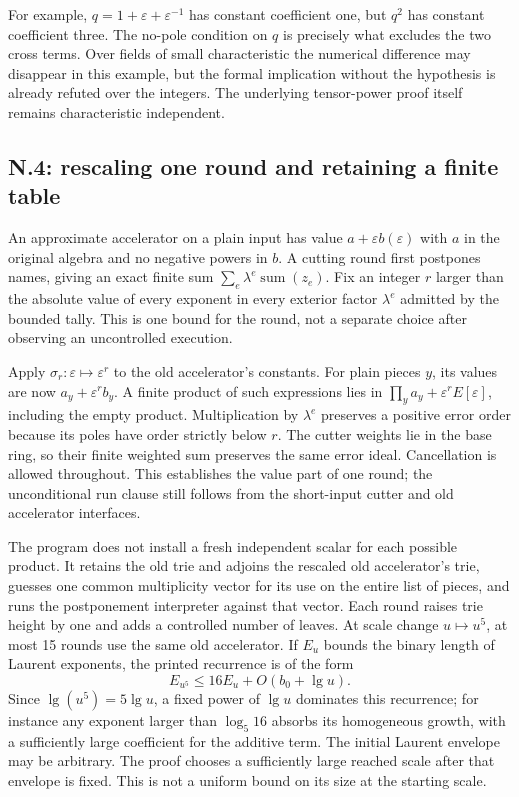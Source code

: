 \documentclass[11pt,letterpaper]{article}
\theoremstyle{definition}\newtheorem{definition}[theorem]{Definition}\newtheorem{example}[theorem]{Example}
\theoremstyle{remark}\newtheorem{remark}[theorem]{Remark}
\begin{document}
For example, $q=1+\varepsilon+\varepsilon^{-1}$ has constant coefficient one, but $q^2$ has constant coefficient three. The no-pole condition on $q$ is precisely what excludes the two cross terms. Over fields of small characteristic the numerical difference may disappear in this example, but the formal implication without the hypothesis is already refuted over the integers. The underlying tensor-power proof itself remains characteristic independent.

\subsection{N.4: rescaling one round and retaining a finite table}
An approximate accelerator on a plain input has value $a+\varepsilon b(\varepsilon)$ with $a$ in the original algebra and no negative powers in $b$. A cutting round first postpones names, giving an exact finite sum $\sum_e\lambda^e\operatorname{sum}(z_e)$. Fix an integer $r$ larger than the absolute value of every exponent in every exterior factor $\lambda^e$ admitted by the bounded tally. This is one bound for the round, not a separate choice after observing an uncontrolled execution.

Apply $\sigma_r:\varepsilon\mapsto\varepsilon^r$ to the old accelerator's constants. For plain pieces $y$, its values are now $a_y+\varepsilon^rb_y$. A finite product of such expressions lies in $\prod_y a_y+\varepsilon^rE[\varepsilon]$, including the empty product. Multiplication by $\lambda^e$ preserves a positive error order because its poles have order strictly below $r$. The cutter weights lie in the base ring, so their finite weighted sum preserves the same error ideal. Cancellation is allowed throughout. This establishes the value part of one round; the unconditional run clause still follows from the short-input cutter and old accelerator interfaces.

The program does not install a fresh independent scalar for each possible product. It retains the old trie and adjoins the rescaled old accelerator's trie, guesses one common multiplicity vector for its use on the entire list of pieces, and runs the postponement interpreter against that vector. Each round raises trie height by one and adds a controlled number of leaves. At scale change $u\mapsto u^5$, at most 15 rounds use the same old accelerator. If $E_u$ bounds the binary length of Laurent exponents, the printed recurrence is of the form
\[
 E_{u^5}\le16E_u+O(b_0+\lg u).
\]
Since $\lg(u^5)=5\lg u$, a fixed power of $\lg u$ dominates this recurrence; for instance any exponent larger than $\log_5 16$ absorbs its homogeneous growth, with a sufficiently large coefficient for the additive term. The initial Laurent envelope may be arbitrary. The proof chooses a sufficiently large reached scale after that envelope is fixed. This is not a uniform bound on its size at the starting scale.
\end{document}
